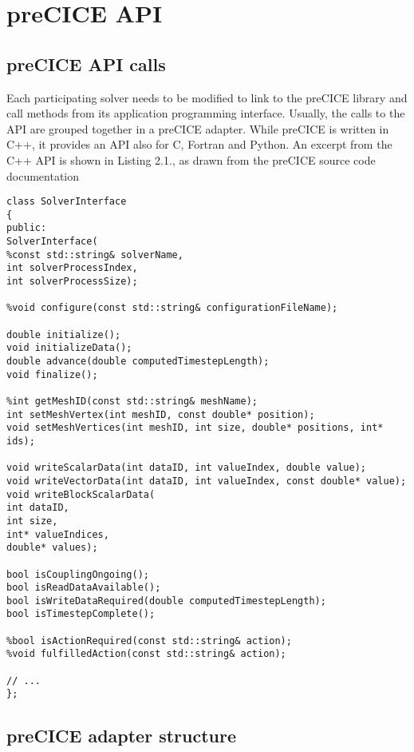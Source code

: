 \chapter{preCICE API}
\label{app:pc-api}

\section{preCICE API calls}
\label{sec:api-code}

Each participating solver needs to be modified to link to the preCICE library and call
methods from its application programming interface. Usually, the calls to the API are
grouped together in a preCICE adapter. While preCICE is written in C++, it provides an
API also for C, Fortran and Python. An excerpt from the C++ API is shown in Listing 2.1.,
as drawn from the preCICE source code documentation


\lstset{language=C++}
\begin{lstlisting}[caption=preCICE API methods]
class SolverInterface
{
public:
SolverInterface(
%const std::string& solverName,
int solverProcessIndex,
int solverProcessSize);

%void configure(const std::string& configurationFileName);

double initialize();
void initializeData();
double advance(double computedTimestepLength);
void finalize();

%int getMeshID(const std::string& meshName);
int setMeshVertex(int meshID, const double* position);
void setMeshVertices(int meshID, int size, double* positions, int* ids);

void writeScalarData(int dataID, int valueIndex, double value);
void writeVectorData(int dataID, int valueIndex, const double* value);
void writeBlockScalarData(
int dataID,
int size,
int* valueIndices,
double* values);

bool isCouplingOngoing();
bool isReadDataAvailable();
bool isWriteDataRequired(double computedTimestepLength);
bool isTimestepComplete();

%bool isActionRequired(const std::string& action);
%void fulfilledAction(const std::string& action);

// ...
};
\end{lstlisting}


\section{preCICE adapter structure}
\label{sec:adapter-code}


